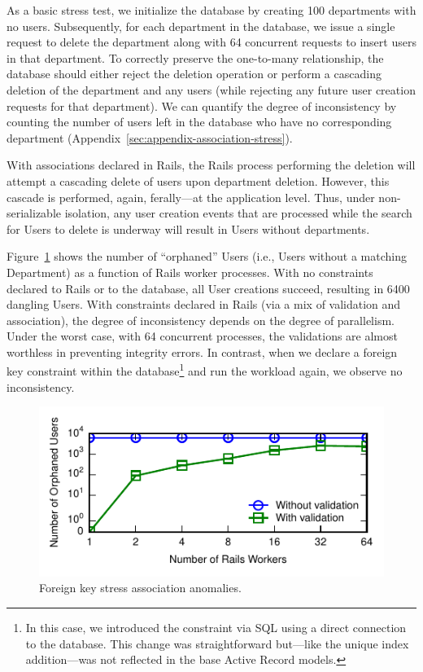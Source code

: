 As a basic stress test, we initialize the database by creating 100
departments with no users. Subsequently, for each department in the
database, we issue a single request to delete the department along
with 64 concurrent requests to insert users in that department. To
correctly preserve the one-to-many relationship, the database should
either reject the deletion operation or perform a cascading deletion
of the department and any users (while rejecting any future user
creation requests for that department). We can quantify the degree of
inconsistency by counting the number of users left in the database who
have no corresponding department (Appendix~\ref{sec:appendix-association-stress}).

With associations declared in Rails, the Rails process performing the
deletion will attempt a cascading delete of users upon department
deletion. However, this cascade is performed, again, ferally---at the
application level. Thus, under non-serializable isolation, any user creation
events that are processed while the search for Users to delete is
underway will result in Users without departments.

Figure~\ref{fig:fk-stress} shows the number of ``orphaned'' Users
(i.e., Users without a matching Department) as a function of Rails
worker processes. With no constraints declared to Rails or to the
database, all User creations succeed, resulting in 6400 dangling
Users. With constraints declared in Rails (via a mix of validation and
association), the degree of inconsistency depends on the degree of
parallelism. Under the worst case, with 64 concurrent processes, the
validations are almost worthless in preventing integrity errors. In
contrast, when we declare a foreign key constraint within the
database\footnote{In this case, we introduced the constraint via SQL
  using a direct connection to the database. This change was
  straightforward but---like the unique index addition---was not
  reflected in the base Active Record models.}  and run the workload
again, we observe no inconsistency.

\begin{figure}
\includegraphics[width=\figscale\columnwidth]{figs/fk-stress-violations.pdf}
\caption{Foreign key stress association anomalies.}
\label{fig:fk-stress}
\end{figure}

